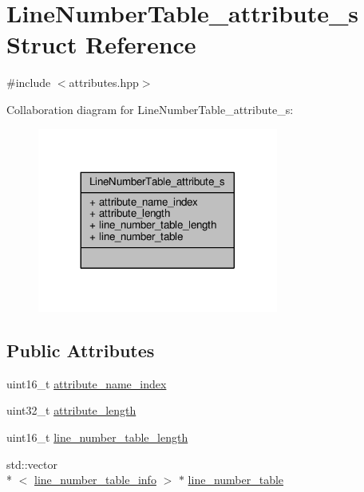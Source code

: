 \hypertarget{structLineNumberTable__attribute__s}{\section{Line\+Number\+Table\+\_\+attribute\+\_\+s Struct Reference}
\label{structLineNumberTable__attribute__s}
}


{\ttfamily \#include $<$attributes.\+hpp$>$}



Collaboration diagram for Line\+Number\+Table\+\_\+attribute\+\_\+s\+:\nopagebreak
\begin{figure}[H]
\begin{center}
\leavevmode
\includegraphics[width=224pt]{structLineNumberTable__attribute__s__coll__graph}
\end{center}
\end{figure}
\subsection*{Public Attributes}
\begin{DoxyCompactItemize}
\item 
uint16\+\_\+t \hyperlink{structLineNumberTable__attribute__s_aac15efe1c90438dc07107171766d8637}{attribute\+\_\+name\+\_\+index}
\item 
uint32\+\_\+t \hyperlink{structLineNumberTable__attribute__s_ab542a17d507ee228ba3967068a20f990}{attribute\+\_\+length}
\item 
uint16\+\_\+t \hyperlink{structLineNumberTable__attribute__s_af17b7841355aa53d48fbfe84e34729c5}{line\+\_\+number\+\_\+table\+\_\+length}
\item 
std\+::vector\\*
$<$ \hyperlink{classline__number__table__info}{line\+\_\+number\+\_\+table\+\_\+info} $>$ $\ast$ \hyperlink{structLineNumberTable__attribute__s_a434f6fcd9cf968392ae7b9436c118e93}{line\+\_\+number\+\_\+table}
\end{DoxyCompactItemize}



